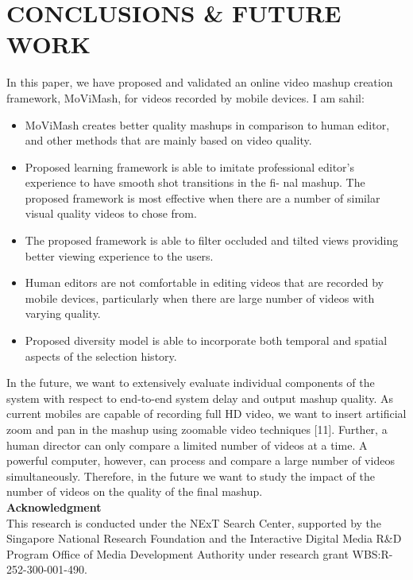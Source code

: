 \documentclass{sig-alternate-05-2015}
\begin{document}
\section{CONCLUSIONS \& FUTURE WORK}
In this paper, we have proposed and validated an online video
mashup creation framework, MoViMash, for videos recorded by
mobile devices. I am sahil:
\begin{itemize}
    \item MoViMash creates better quality mashups in comparison to
human editor, and other methods that are mainly based on
video quality.
    \item Proposed learning framework is able to imitate professional
editor’s experience to have smooth shot transitions in the fi-
nal mashup. The proposed framework is most effective when there are a number of similar visual quality videos to chose
from.
    \item The proposed framework is able to filter occluded and tilted
views providing better viewing experience to the users.
    \item Human editors are not comfortable in editing videos that are
recorded by mobile devices, particularly when there are large
number of videos with varying quality.
    \item Proposed diversity model is able to incorporate both temporal and spatial aspects of the selection history.
\end{itemize}
In the future, we want to extensively evaluate individual components of the system with respect to end-to-end system delay and
output mashup quality. As current mobiles are capable of recording full HD video, we want to insert artificial zoom and pan in the
mashup using zoomable video techniques [11]. Further, a human
director can only compare a limited number of videos at a time.
A powerful computer, however, can process and compare a large
number of videos simultaneously. Therefore, in the future we want
to study the impact of the number of videos on the quality of the
final mashup.\\
\textbf{Acknowledgment}\\
This research is conducted under the NExT Search Center, supported by the Singapore National Research Foundation and the Interactive Digital Media R\&D Program Office of Media Development Authority under research grant WBS:R-252-300-001-490.









%
%
\end{document}

